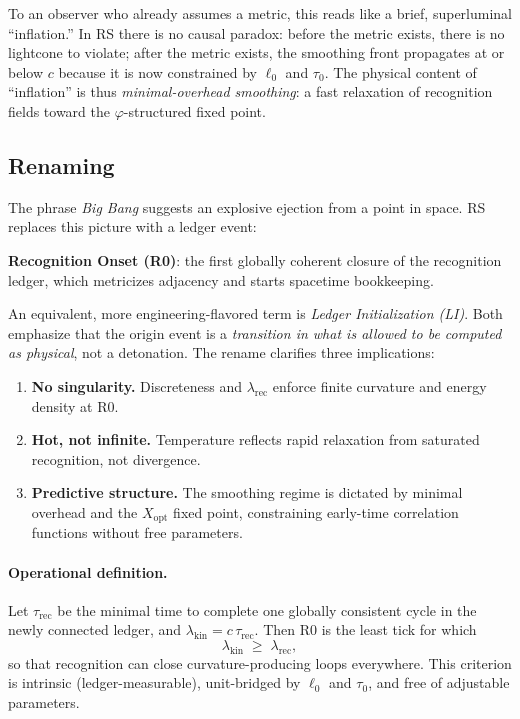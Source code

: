 \documentclass[11pt]{article}
\theoremstyle{definition}
\theoremstyle{remark}
\begin{document}
To an observer who already assumes a metric, this reads like a brief, superluminal “inflation.” In RS there is no causal paradox: before the metric exists, there is no lightcone to violate; after the metric exists, the smoothing front propagates at or below \(c\) because it is now constrained by \(\ell_0\) and \(\tau_0\). The physical content of “inflation” is thus \emph{minimal-overhead smoothing}: a fast relaxation of recognition fields toward the \(\varphi\)-structured fixed point.

\subsection{Renaming}
The phrase \emph{Big Bang} suggests an explosive ejection from a point in space. RS replaces this picture with a ledger event:

\begin{center}
\textbf{Recognition Onset (R0)}: the first globally coherent closure of the recognition ledger, which metricizes adjacency and starts spacetime bookkeeping.
\end{center}

An equivalent, more engineering-flavored term is \emph{Ledger Initialization (LI)}. Both emphasize that the origin event is a \emph{transition in what is allowed to be computed as physical}, not a detonation. The rename clarifies three implications:

\begin{enumerate}
\item \textbf{No singularity.} Discreteness and \(\lambda_{\mathrm{rec}}\) enforce finite curvature and energy density at R0.
\item \textbf{Hot, not infinite.} Temperature reflects rapid relaxation from saturated recognition, not divergence.
\item \textbf{Predictive structure.} The smoothing regime is dictated by minimal overhead and the \(X_{\mathrm{opt}}\) fixed point, constraining early-time correlation functions without free parameters.
\end{enumerate}

\paragraph{Operational definition.} Let \(\tau_{\mathrm{rec}}\) be the minimal time to complete one globally consistent cycle in the newly connected ledger, and \(\lambda_{\mathrm{kin}}=c\,\tau_{\mathrm{rec}}\). Then R0 is the least tick for which
\[
\lambda_{\mathrm{kin}}\;\ge\;\lambda_{\mathrm{rec}},
\]
so that recognition can close curvature-producing loops everywhere. This criterion is intrinsic (ledger-measurable), unit-bridged by \(\ell_0\) and \(\tau_0\), and free of adjustable parameters.
\end{document}
